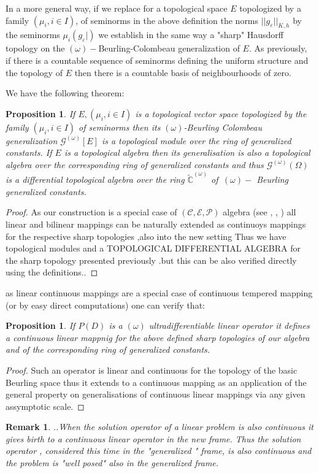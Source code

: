 \documentclass[12pt,a4paper]{amsart}
\newtheorem{proposition}[theorem]{Proposition}
\newtheorem{remark}[theorem]{Remark}
\begin{document}
 
  In a more general way, if we replace for a topological space $E$ topologized by a family $(\mu_i, i\in I)$, of seminorms in the above definition the norms $||g_{\varepsilon}||_{K,h}$ by the seminorms  $\mu_i (g_{\varepsilon}|)$ we establish in the same way a "sharp" Hausdorff topology on the $(\omega)-$Beurling-Colombeau generalization of $E.$ As previously, if there is a countable sequence of seminorms defining the uniform structure and the topology of $E$ then there is a countable basis of neighbourhoods of zero. 


We have the following theorem:
  
\begin{proposition}
If $E,(\mu_i ,i\in I)$ is a topological vector space topologized by the family  $(\mu_i ,i\in I)$ of seminorms then its $(\omega)$-Beurling Colombeau generalization $\mathcal{G}^{(\omega)}[E]$ is a topological module over the ring of generalized constants.  If $E$ is a topological algebra then its generalisation  is also a topological algebra  over  the corresponding ring of generalized constants and thus $\mathcal{G}^{(\omega)} (\Omega)$ is a differential topological algebra over the ring   $\tilde{\mathbb{C}}^{(\omega)}$ of 
$\, (\omega)-$ Beurling generalized constants.
\end{proposition}

\begin{proof}
As our construction is a special case of $(\mathcal{C,E,P})$ algebra (see \cite{M.1}, \cite{D}, \cite{D.S.1} ) all linear and bilinear mappings can be naturally extended as continuoys mappings for the respective sharp topologies ,also into the new setting 
Thus we have topological modules and  a TOPOLOGICAL DIFFERENTIAL ALGEBRA for the sharp topology presented previously .but this can be also verified directly using the definitions..
\end{proof}
 as linear continuous mappings are a special case of continuous tempered mapping (or by easy direct computations) one can  verify that:

\begin{proposition}
If $P(D)$ is a $(\omega)$ ultradifferentiable linear operator it defines a continuous linear mappnig for the above defined sharp topologies of our algebra and  of the corresponding  ring of  generalized constants.
\end{proposition}

\begin{proof}
Such an operator is linear and continuous for the topology of the basic Beurling space thus it extends to a continuous mapping as an application of the general property on generalisations of continuous linear mappings  via any given assymptotic scale.

\end{proof}
 \begin{remark} ..When the solution operator of a linear problem is also continuous it gives birth to a continuous linear operator in the new frame. Thus the solution operator , considered this time in the "generalized " frame, is also continuous and the problem is "well posed" also  in the generalized frame.
\end{remark}
\end{document}
